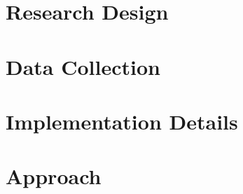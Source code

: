 \section{Research Design}
\label{sec:research_design}

\section{Data Collection}
\label{sec:data_collection}

\section{Implementation Details}
\label{sec:implementation_details}

\section{Approach}
\label{sec:approach}
